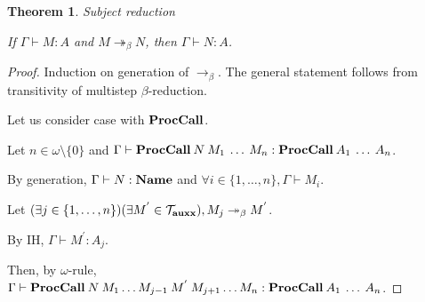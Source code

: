 \documentclass[a4paper]{article}
\newtheorem{theorem}{Theorem}
\begin{document}
\begin{theorem} Subject reduction

  If $\Gamma \vdash M : A$ and $M \twoheadrightarrow_{\beta} N$, then $\Gamma \vdash N : A$.
\end{theorem}

\begin{proof}

Induction on generation of $\rightarrow_{\beta}$. The general statement follows from transitivity of
multistep $\beta$-reduction.

Let us consider case with ${\bf ProcCall}$.

Let $n \in \omega \setminus \{ 0 \}$ and $\Gamma \vdash {\bf ProcCall} \: N \: M_1 \: \dots \: M_n : {\bf ProcCall} \: A_1 \: \dots \: A_n$.

By generation, $\Gamma \vdash N : {\bf Name}$ and $\forall i \in \{ 1, \dots, n\}, \Gamma \vdash M_i$.

Let $(\exists j \in \{ 1, \dots, n \}) (\exists M^{'} \in \mathcal{T}_{\bf auxx}), M_j \twoheadrightarrow_{\beta} M^{'}$.

By IH, $\Gamma \vdash M^{'} : A_j$.

Then, by $\omega$-rule, $\Gamma \vdash {\bf ProcCall \:} N \: M_1 \dots M_{j - 1} \: M^{'} \: M_{j+1} \dots M_n : {\bf ProcCall} \: A_1 \: \dots \: A_n$.
\end{proof}
\end{document}
